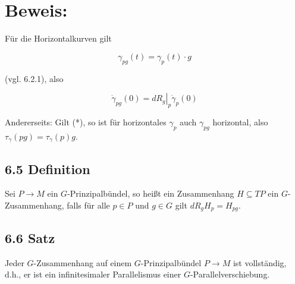 \section*{Beweis:}
Für die Horizontalkurven gilt

$$
\gamma_{p g}(t)=\gamma_{p}(t) \cdot g
$$

(vgl. 6.2.1), also

$$
\dot{\gamma}_{p g}(0)=\left.d R_{g}\right|_{p} \dot{\gamma}_{p}(0)
$$

Andererseits: Gilt (*), so ist für horizontales $\gamma_{p}$ auch $\gamma_{p g}$ horizontal, also $\tau_{\gamma}(p g)=\tau_{\gamma}(p) g$.

\subsection*{6.5 Definition}
Sei $P \rightarrow M$ ein $G$-Prinzipalbündel, so heißt ein Zusammenhang $H \subseteq T P$ ein $G$-Zusammenhang, falls für alle $p \in P$ und $g \in G$ gilt $d R_{g} H_{p}=H_{p g}$.

\subsection*{6.6 Satz}
Jeder $G$-Zusammenhang auf einem $G$-Prinzipalbündel $P \rightarrow M$ ist vollständig, d.h., er ist ein infinitesimaler Parallelismus einer $G$-Parallelverschiebung.

